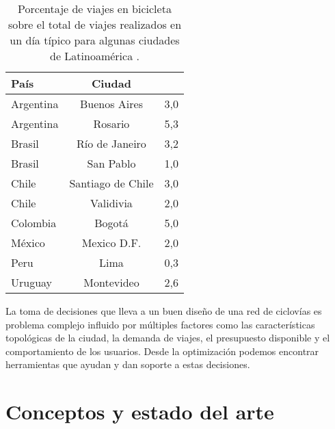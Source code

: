   \begin{table}[h!]
    \centering
      \begin{tabular}{lcS[table-number-alignment=center]}
      \toprule
      País & Ciudad &  \\
      \midrule
        Argentina & Buenos Aires & 3,0 \\
        Argentina & Rosario & 5,3 \\
        Brasil & Río de Janeiro & 3,2 \\
        Brasil & San Pablo & 1,0 \\
        Chile & Santiago de Chile & 3,0 \\
        Chile & Validivia & 2,0 \\
        Colombia & Bogotá & 5,0 \\
        México & Mexico D.F. & 2,0 \\
        Peru & Lima & 0,3 \\
        Uruguay & Montevideo & 2,6 \\
      \bottomrule
    \end{tabular}
      \caption{Porcentaje de viajes en bicicleta sobre el total de viajes realizados en un día típico para algunas ciudades de Latinoamérica \textcite{Idb2020}.}
      \label{table:bicycleusagelatinamerica}
  \end{table}

  La toma de decisiones que lleva a un buen diseño de una red de ciclovías es problema complejo influido por múltiples factores como las características topológicas de la ciudad, la demanda de viajes, el presupuesto disponible y el comportamiento de los usuarios. Desde la optimización podemos encontrar herramientas que ayudan y dan soporte a estas decisiones.

  \section{Conceptos y estado del arte}




